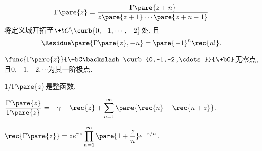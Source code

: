 \documentclass[../ComplexVariable.tex]{subfiles}
\begin{document}
\[ \Gamma\pare{z} = \frac{\Gamma\pare{z+n}}{z\pare{z+1}\cdots \pare{z+n-1}} \]
将定义域开拓至$\+bC\backslash \curb{0,-1,\cdots, -2}$处. 且
\[ \Residue\pare{\Gamma\pare{z}, -n} = \pare{-1}^n \rec{n!}. \]
\begin{theorem}
    $\func{\Gamma\pare{z}}{\+bC\backslash\curb{0,-1,-2,\cdots}}{\+bC}$无零点, 且$0,-1,-2,\cdots$为其一阶极点.
\end{theorem}
\begin{theorem}
    $1/\Gamma\pare{z}$是整函数.
\end{theorem}
\begin{theorem}
    $\displaystyle \frac{\Gamma'\pare{z}}{\Gamma\pare{z}} = - \gamma - \rec{z} + \sum_{n=1}^\infty \pare{\rec{n} - \rec{n+z}}$.
\end{theorem}
\begin{theorem}
    $\displaystyle \rec{\Gamma\pare{z}} = ze^{\gamma z} \displaystyle \prod_{n=1}^\infty \pare{1+\frac{z}{n}}e^{-z/n}$.
\end{theorem}


\end{document}
